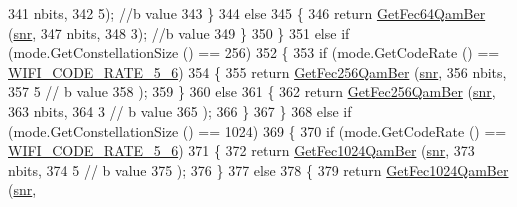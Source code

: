 \begin{DoxyCode}
341                                      nbits,
342                                      5); \textcolor{comment}{//b value}
343             \}
344           \textcolor{keywordflow}{else}
345             \{
346               \textcolor{keywordflow}{return} \hyperlink{classns3_1_1NistErrorRateModel_a4bb2f176c01cd6175475b5de245bdcea}{GetFec64QamBer} (\hyperlink{lte__amc_8m_a7543c5e4e80c828b652e0c63e4a6de70}{snr},
347                                      nbits,
348                                      3); \textcolor{comment}{//b value}
349             \}
350         \}
351       \textcolor{keywordflow}{else} \textcolor{keywordflow}{if} (mode.GetConstellationSize () == 256)
352         \{
353           \textcolor{keywordflow}{if} (mode.GetCodeRate () == \hyperlink{namespacens3_aeaf3a86fd4bdb7829955238fba43e2adaf0309d61b4cf97e5718f6d3b9fdba3aa}{WIFI\_CODE\_RATE\_5\_6})
354             \{
355               \textcolor{keywordflow}{return} \hyperlink{classns3_1_1NistErrorRateModel_aef4d82e4f8b0dc2e8a8e22afe259bbd6}{GetFec256QamBer} (\hyperlink{lte__amc_8m_a7543c5e4e80c828b652e0c63e4a6de70}{snr},
356                                       nbits,
357                                       5     \textcolor{comment}{// b value}
358                                       );
359             \}
360           \textcolor{keywordflow}{else}
361             \{
362               \textcolor{keywordflow}{return} \hyperlink{classns3_1_1NistErrorRateModel_aef4d82e4f8b0dc2e8a8e22afe259bbd6}{GetFec256QamBer} (\hyperlink{lte__amc_8m_a7543c5e4e80c828b652e0c63e4a6de70}{snr},
363                                       nbits,
364                                       3     \textcolor{comment}{// b value}
365                                       );
366             \}
367         \}
368       \textcolor{keywordflow}{else} \textcolor{keywordflow}{if} (mode.GetConstellationSize () == 1024)
369         \{
370           \textcolor{keywordflow}{if} (mode.GetCodeRate () == \hyperlink{namespacens3_aeaf3a86fd4bdb7829955238fba43e2adaf0309d61b4cf97e5718f6d3b9fdba3aa}{WIFI\_CODE\_RATE\_5\_6})
371             \{
372               \textcolor{keywordflow}{return} \hyperlink{classns3_1_1NistErrorRateModel_ab995eadfb8b3f587c5976d0e91b20c68}{GetFec1024QamBer} (\hyperlink{lte__amc_8m_a7543c5e4e80c828b652e0c63e4a6de70}{snr},
373                                        nbits,
374                                        5    \textcolor{comment}{// b value}
375                                        );
376             \}
377           \textcolor{keywordflow}{else}
378             \{
379               \textcolor{keywordflow}{return} \hyperlink{classns3_1_1NistErrorRateModel_ab995eadfb8b3f587c5976d0e91b20c68}{GetFec1024QamBer} (\hyperlink{lte__amc_8m_a7543c5e4e80c828b652e0c63e4a6de70}{snr},

\end{DoxyCode}
